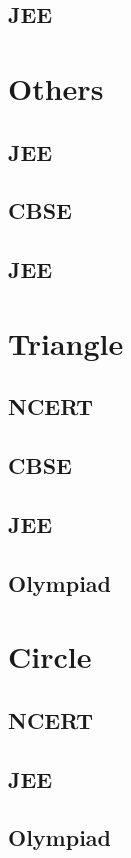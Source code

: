 \documentclass[journal]{IEEEtran}
\begin{document}
\subsection{JEE}

%
\section{Others}
\subsection{JEE}
%

\subsection{CBSE}

\subsection{JEE}

%
\section{Triangle}
\subsection{NCERT}

\subsection{CBSE}

\subsection{JEE}
 
\subsection{Olympiad}

\section{Circle}
\subsection{NCERT}

\subsection{JEE}

\subsection{Olympiad}

%
\end{document}

